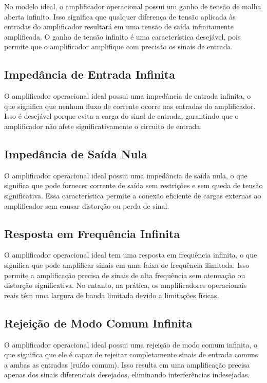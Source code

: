 \documentclass[12pt,twoside, a4paper, twocolumn]{article}
\begin{document}
No modelo ideal, o amplificador operacional possui um ganho de tensão de malha aberta infinito. Isso significa que qualquer diferença de tensão aplicada às entradas do amplificador resultará em uma tensão de saída infinitamente amplificada. O ganho de tensão infinito é uma característica desejável, pois permite que o amplificador amplifique com precisão os sinais de entrada.

\subsection{Impedância de Entrada Infinita}

O amplificador operacional ideal possui uma impedância de entrada infinita, o que significa que nenhum fluxo de corrente ocorre nas entradas do amplificador. Isso é desejável porque evita a carga do sinal de entrada, garantindo que o amplificador não afete significativamente o circuito de entrada.

\subsection{Impedância de Saída Nula}

O amplificador operacional ideal possui uma impedância de saída nula, o que significa que pode fornecer corrente de saída sem restrições e sem queda de tensão significativa. Essa característica permite a conexão eficiente de cargas externas ao amplificador sem causar distorção ou perda de sinal.

\subsection{Resposta em Frequência Infinita}

O amplificador operacional ideal tem uma resposta em frequência infinita, o que significa que pode amplificar sinais em uma faixa de frequência ilimitada. Isso permite a amplificação precisa de sinais de alta frequência sem atenuação ou distorção significativa. No entanto, na prática, os amplificadores operacionais reais têm uma largura de banda limitada devido a limitações físicas.

\subsection{Rejeição de Modo Comum Infinita}

O amplificador operacional ideal possui uma rejeição de modo comum infinita, o que significa que ele é capaz de rejeitar completamente sinais de entrada comuns a ambas as entradas (ruído comum). Isso resulta em uma amplificação precisa apenas dos sinais diferenciais desejados, eliminando interferências indesejadas.
\end{document}
